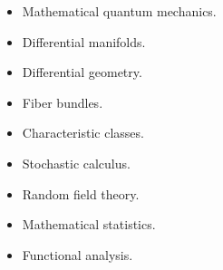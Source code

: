 \begin{itemize}
	\item Mathematical quantum mechanics.
	\item Differential manifolds.
	\item Differential geometry.
	\item Fiber bundles.
	\item Characteristic classes.
	\item Stochastic calculus.
	\item Random field theory.
	\item Mathematical statistics. 
	\item Functional analysis.
\end{itemize}

